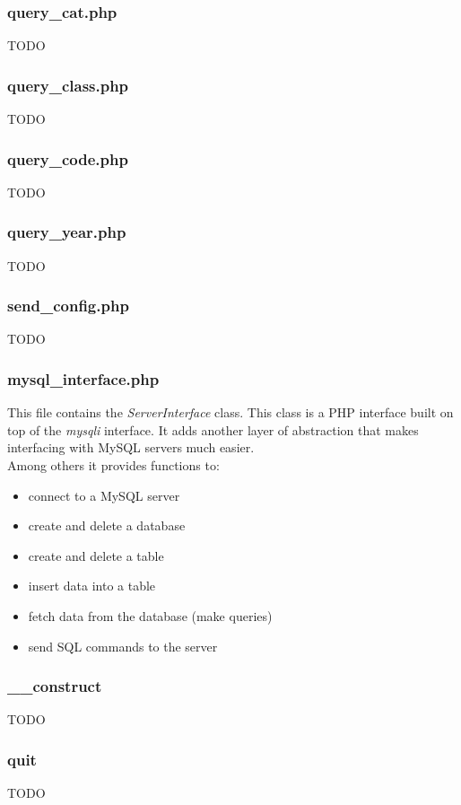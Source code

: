 \documentclass{article}
\begin{document}
\subsubsection{query\_cat.php}
TODO

\subsubsection{query\_class.php}
TODO

\subsubsection{query\_code.php}
TODO

\subsubsection{query\_year.php}
TODO

\subsubsection{send\_config.php}
TODO

\subsubsection{mysql\_interface.php}
This file contains the \textit{ServerInterface} class. This class is a PHP interface built on top of the \textit{mysqli} interface. It adds another layer of abstraction that makes interfacing with MySQL servers much easier.
\\Among others it provides functions to:
\begin{itemize}
	\item connect to a MySQL server
	\item create and delete a database
	\item create and delete a table
	\item insert data into a table
	\item fetch data from the database (make queries)
	\item send SQL commands to the server
\end{itemize}

\subsubsection*{\_\_construct}
TODO
\subsubsection*{quit}
TODO
\end{document}
